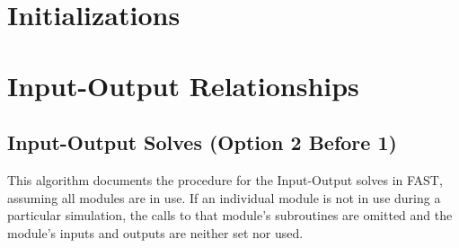 \documentclass[10pt,letterpaper,oneside,notitlepage]{article}
\begin{document}
\printnomenclature

\section{Initializations}


\pagebreak %
\section{Input-Output Relationships}
\subsection {Input-Output Solves (Option 2 Before 1)}
This algorithm documents the procedure for the Input-Output solves in FAST, assuming
all modules are in use. If an individual module is not in use during a particular
simulation, the calls to that module's subroutines are omitted and the module's 
inputs and outputs are neither set nor used.
\end{document}
